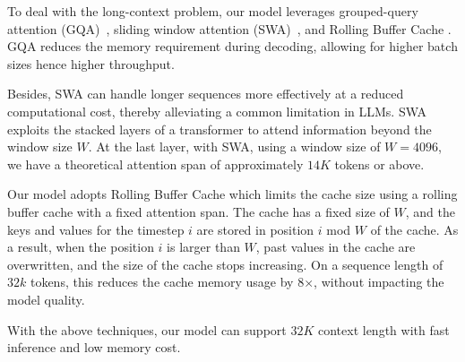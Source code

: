 To deal with the long-context problem, our model leverages grouped-query attention (GQA)~\cite{ainslie2023gqa}, sliding window attention (SWA)~\cite{beltagy2020longformer}, and Rolling Buffer Cache \cite{jiang2023mistral7b}. GQA reduces the memory requirement during decoding, allowing for higher batch sizes hence higher throughput. 

Besides, SWA can handle longer sequences more effectively at a reduced computational cost, thereby alleviating a common limitation in LLMs. SWA exploits the stacked layers of a transformer to attend information beyond the window size $W$. 
At the last layer, with SWA, using a window size of $W = 4096$, we have a theoretical attention span of approximately $14K$ tokens or above. 


Our model adopts Rolling Buffer Cache which limits the cache size using a rolling buffer cache with a fixed attention span. The cache has a fixed size of $W$, and the keys and values for the timestep $i$ are stored in position $i$ mod $W$ of the cache. As a result, when the position $i$ is larger than $W$, past values in the cache are overwritten, and the size of the cache stops increasing. On a sequence length of $32k$ tokens, this reduces the cache memory usage by 8$\times$, without impacting the model quality.

With the above techniques, our model can support $32K$ context length with fast inference and low memory cost.
